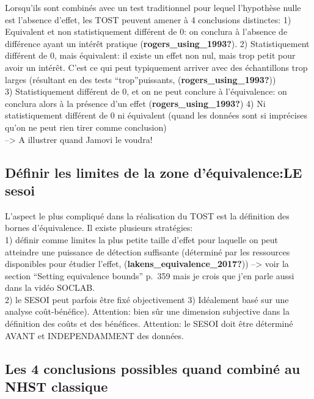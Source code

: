 \documentclass[
  english,
  man]{apa6}
\begin{document}
Lorsqu'ils sont combinés avec un test traditionnel pour lequel l'hypothèse nulle est l'absence d'effet, les TOST peuvent amener à 4 conclusions distinctes:
1) Equivalent et non statistiquement différent de 0: on conclura à l'absence de différence ayant un intérêt pratique (\textbf{rogers\_using\_1993?}).
2) Statistiquement différent de 0, mais équivalent: il existe un effet non nul, mais trop petit pour avoir un intérêt. C'est ce qui peut typiquement arriver avec des échantillons trop larges (résultant en des tests ``trop''puissants, (\textbf{rogers\_using\_1993?}))\\
3) Statistiquement différent de 0, et on ne peut conclure à l'équivalence: on conclura alors à la présence d'un effet (\textbf{rogers\_using\_1993?})
4) Ni statistiquement différent de 0 ni équivalent (quand les données sont si imprécises qu'on ne peut rien tirer comme conclusion)\\
--\textgreater{} A illustrer quand Jamovi le voudra!

\hypertarget{duxe9finir-les-limites-de-la-zone-duxe9quivalencele-sesoi}{%
\subsection{Définir les limites de la zone d'équivalence:LE sesoi}\label{duxe9finir-les-limites-de-la-zone-duxe9quivalencele-sesoi}}

L'aspect le plus compliqué dans la réalisation du TOST est la définition des bornes d'équivalence. Il existe plusieurs stratégies:\\
1) définir comme limites la plus petite taille d'effet pour laquelle on peut atteindre une puissance de détection suffisante (déterminé par les ressources disponibles pour étudier l'effet, (\textbf{lakens\_equivalence\_2017?})) --\textgreater{} voir la section ``Setting equivalence bounds'' p.~359 mais je crois que j'en parle aussi dans la vidéo SOCLAB.\\
2) le SESOI peut parfois être fixé objectivement
3) Idéalement basé sur une analyse coût-bénéfice). Attention: bien sûr une dimension subjective dans la définition des coûts et des bénéfices.
Attention: le SESOI doit être déterminé AVANT et INDEPENDAMMENT des données.

\hypertarget{les-4-conclusions-possibles-quand-combinuxe9-au-nhst-classique}{%
\subsection{Les 4 conclusions possibles quand combiné au NHST classique}\label{les-4-conclusions-possibles-quand-combinuxe9-au-nhst-classique}}
\end{document}
